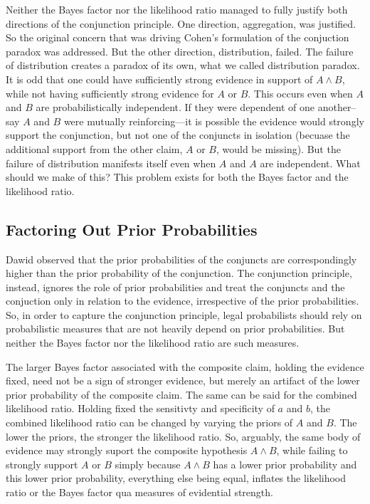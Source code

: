 \documentclass[10pt,dvipsnames,enabledeprecatedfontcommands]{scrartcl}
\begin{document}
Neither the Bayes factor nor the likelihood ratio managed to fully
justify both directions of the conjunction principle. One direction,
aggregation, was justified. So the original concern that was driving
Cohen's formulation of the conjuction paradox was addressed. But the
other direction, distribution, failed. The failure of distribution
creates a paradox of its own, what we called distribution paradox. It is
odd that one could have sufficiently strong evidence in support of
\(A\wedge B\), while not having sufficiently strong evidence for \(A\)
or \(B\). This occurs even when \(A\) and \(B\) are probabilistically
independent. If they were dependent of one another--say \(A\) and \(B\)
were mutually reinforcing---it is possible the evidence would strongly
support the conjunction, but not one of the conjuncts in isolation
(becuase the additional support from the other claim, \(A\) or \(B\),
would be missing). But the failure of distribution manifests itself even
when \(A\) and \(A\) are independent. What should we make of this? This
problem exists for both the Bayes factor and the likelihood ratio.

\hypertarget{factoring-out-prior-probabilities}{%
\subsection{Factoring Out Prior
Probabilities}\label{factoring-out-prior-probabilities}}

Dawid observed that the prior probabilities of the conjuncts are
correspondingly higher than the prior probability of the conjunction.
The conjunction principle, instead, ignores the role of prior
probabilities and treat the conjuncts and the conjuction only in
relation to the evidence, irrespective of the prior probabilities. So,
in order to capture the conjunction principle, legal probabilists should
rely on probabilistic measures that are not heavily depend on prior
probabilities. But neither the Bayes factor nor the likelihood ratio are
such measures.

The larger Bayes factor associated with the composite claim, holding the
evidence fixed, need not be a sign of stronger evidence, but merely an
artifact of the lower prior probability of the composite claim. The same
can be said for the combined likelihood ratio. Holding fixed the
sensitivty and specificity of \(a\) and \(b\), the combined likelihood
ratio can be changed by varying the priors of \(A\) and \(B\). The lower
the priors, the stronger the likelihood ratio. So, arguably, the same
body of evidence may strongly suport the composite hypothesis
\(A\wedge B\), while failing to strongly support \(A\) or \(B\) simply
because \(A\wedge B\) has a lower prior probability and this lower prior
probability, everything else being equal, inflates the likelihood ratio
or the Bayes factor qua measures of evidential strength.
\end{document}
